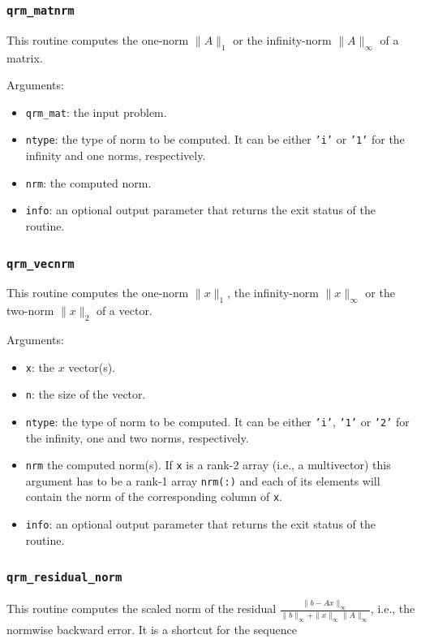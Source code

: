 \documentclass[11pt]{article}
\begin{document}
\subsubsection{\texttt{qrm\_matnrm}}
This routine computes the one-norm $\|A\|_1$ or the infinity-norm
$\|A\|_\infty$ of a matrix.


\noindent Arguments:
\begin{itemize}
\item \texttt{qrm\_mat}: the input problem.
\item \texttt{ntype}: the type of norm to be computed. It can be
  either \texttt{'i'} or \texttt{'1'} for the infinity and one norms,
  respectively.
\item \texttt{nrm}: the computed norm.
\item \texttt{info}: an optional output parameter that returns the
  exit status of the routine.
\end{itemize}


\subsubsection{\texttt{qrm\_vecnrm}}
This routine computes the one-norm $\|x\|_1$, the infinity-norm
$\|x\|_\infty$ or the two-norm $\|x\|_2$ of a vector.


\noindent Arguments:
\begin{itemize}
\item \texttt{x}: the $x$ vector(s).
\item \texttt{n}: the size of the vector.
\item \texttt{ntype}: the type of norm to be computed. It can be
  either \texttt{'i'}, \texttt{'1'} or \texttt{'2'} for the infinity,
  one and two norms, respectively.
\item \texttt{nrm} the computed norm(s). If \texttt{x} is a rank-2 array
  (i.e., a multivector) this argument has to be a rank-1 array
  \texttt{nrm(:)} and each of its elements will contain the norm of
  the corresponding column of \texttt{x}.
\item \texttt{info}: an optional output parameter that returns the
  exit status of the routine.
\end{itemize}

\subsubsection{\texttt{qrm\_residual\_norm}}
This routine computes the scaled norm of the residual
$\frac{\|b-Ax\|_\infty}{\|b\|_\infty + \|x\|_\infty\|A\|_\infty}$,
i.e., the normwise backward error. It is a shortcut for the sequence
\end{document}
